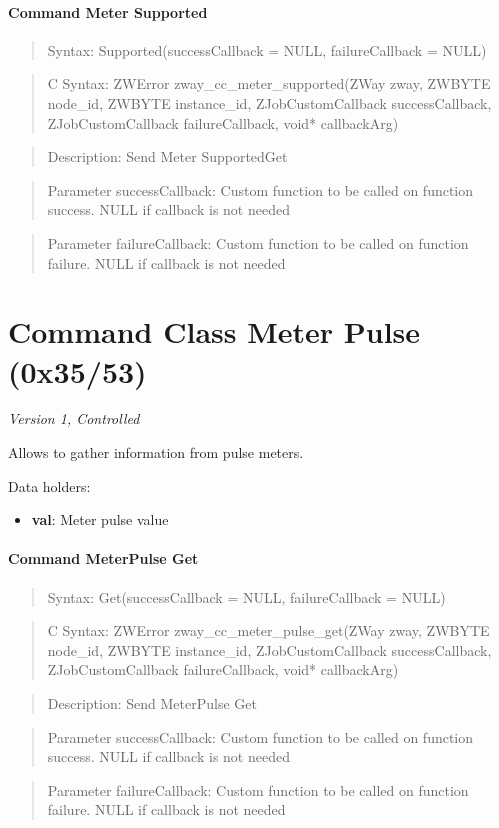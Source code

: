 \paragraph{Command Meter Supported}
\begin{quote}Syntax: Supported(successCallback = NULL, failureCallback = NULL)\end{quote}
\begin{quote}C Syntax: ZWError zway\_cc\_meter\_supported(ZWay zway, ZWBYTE node\_id, ZWBYTE instance\_id, ZJobCustomCallback successCallback, ZJobCustomCallback failureCallback, void* callbackArg)\end{quote}
\begin{quote}Description: Send Meter SupportedGet\end{quote}
\begin{quote}Parameter successCallback: Custom function to be called on function success. NULL if callback is not needed\end{quote}
\begin{quote}Parameter failureCallback: Custom function to be called on function failure. NULL if callback is not needed\end{quote}



\section{Command Class Meter Pulse (0x35/53)}

\textit{Version 1, Controlled}
\newline

Allows to gather information from pulse meters.
\newline

\noindent
Data holders:

\begin{itemize}
\item \textbf{val}: Meter pulse value
\end{itemize}

\paragraph{Command MeterPulse Get}
\begin{quote}Syntax: Get(successCallback = NULL, failureCallback = NULL)\end{quote}
\begin{quote}C Syntax: ZWError zway\_cc\_meter\_pulse\_get(ZWay zway, ZWBYTE node\_id, ZWBYTE instance\_id, ZJobCustomCallback successCallback, ZJobCustomCallback failureCallback, void* callbackArg)\end{quote}
\begin{quote}Description: Send MeterPulse Get\end{quote}
\begin{quote}Parameter successCallback: Custom function to be called on function success. NULL if callback is not needed\end{quote}
\begin{quote}Parameter failureCallback: Custom function to be called on function failure. NULL if callback is not needed\end{quote}



